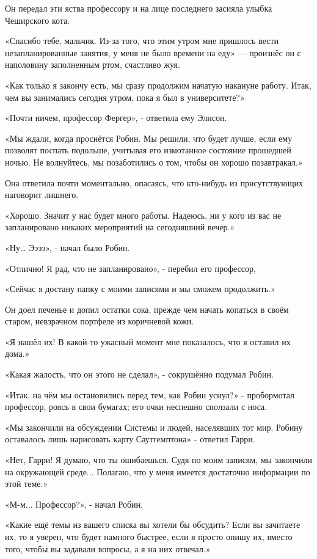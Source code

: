 \documentclass[a5paper, 9pt,
final, openany, twoside=true]{memoir}
\begin{document}
Он передал эти яства профессору и на лице последнего засияла улыбка Чеширского кота.

«Спасибо тебе, мальчик. Из-за того, что этим утром мне пришлось вести незапланированные занятия, у меня не было времени на еду» — произнёс он с наполовину заполненным ртом, счастливо жуя.

«Как только я закончу есть, мы сразу продолжим начатую накануне работу. Итак, чем вы занимались сегодня утром, пока я был в университете?»

«Почти ничем, профессор Фергер», - ответила ему Элисон.

«Мы ждали, когда проснётся Робин. Мы решили, что будет лучше, если ему позволят поспать подольше, учитывая его измотанное состояние прошедшей ночью. Не волнуйтесь, мы позаботились о том, чтобы он хорошо позавтракал.»

Она ответила почти моментально, опасаясь, что кто-нибудь из присутствующих наговорит лишнего.

«Хорошо. Значит у нас будет много работы. Надеюсь, ни у кого из вас не запланировано никаких мероприятий на сегодняшний вечер.»

«Ну… Ээээ», - начал было Робин.

«Отлично! Я рад, что не запланировано», - перебил его профессор,

«Сейчас я достану папку с моими записями и мы сможем продолжить.»

Он доел печенье и допил остатки сока, прежде чем начать копаться в своём старом, невзрачном портфеле из коричневой кожи.

«Я нашёл их! В какой-то ужасный момент мне показалось, что я оставил их дома.»

«Какая жалость, что он этого не сделал», - сокрушённо подумал Робин.

«Итак, на чём мы остановились перед тем, как Робин уснул?» - пробормотал профессор, роясь в свои бумагах; его очки неспешно сползали с носа.

«Мы закончили на обсуждении Системы и людей, населявших тот мир. Робину оставалось лишь нарисовать карту Саутгемптона» - ответил Гарри.

«Нет, Гарри! Я думаю, что ты ошибаешься. Судя по моим записям, мы закончили на окружающей среде... Полагаю, что у меня имеется достаточно информации по этой теме.»

«М-м... Профессор?», - начал Робин,

«Какие ещё темы из вашего списка вы хотели бы обсудить? Если вы зачитаете их, то я уверен, что будет намного быстрее, если я просто опишу их, вместо того, чтобы вы задавали вопросы, а я на них отвечал.»
\end{document}
